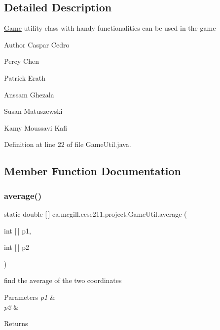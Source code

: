 \subsection{Detailed Description}
\hyperlink{enumca_1_1mcgill_1_1ecse211_1_1project_1_1_game}{Game} utility class with handy functionalities can be used in the game

\begin{DoxyAuthor}{Author}
Caspar Cedro 

Percy Chen 

Patrick Erath 

Anssam Ghezala 

Susan Matuszewski 

Kamy Moussavi Kafi 
\end{DoxyAuthor}


Definition at line 22 of file Game\+Util.\+java.



\subsection{Member Function Documentation}
\mbox{\label{classca_1_1mcgill_1_1ecse211_1_1project_1_1_game_util_ae5c5c445ab84516991219ca3783fcaa4}} 
\subsubsection{\texorpdfstring{average()}{average()}}
{\footnotesize\ttfamily static double \mbox{[}$\,$\mbox{]} ca.\+mcgill.\+ecse211.\+project.\+Game\+Util.\+average (\begin{DoxyParamCaption}\item[{int \mbox{[}$\,$\mbox{]}}]{p1,  }\item[{int \mbox{[}$\,$\mbox{]}}]{p2 }\end{DoxyParamCaption})\hspace{0.3cm}{\ttfamily [static]}}

find the average of the two coordinates


\begin{DoxyParams}{Parameters}
{\em p1} & \\
\hline
{\em p2} & \\
\hline
\end{DoxyParams}
\begin{DoxyReturn}{Returns}

\end{DoxyReturn}



